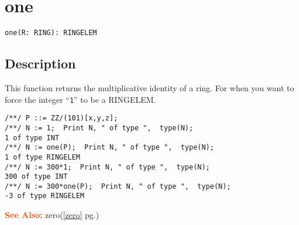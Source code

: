 \documentclass[a4paper]{mybook}
\newenvironment{command}{}{} %
\newcommand\SeeAlso{\par\textcolor{OrangeRed}{\textbf{\large See Also: }}}
\begin{document}
\section{one}
\label{one}
\begin{command} %


\begin{Verbatim}[label=syntax, rulecolor=\color{MidnightBlue},
frame=single]
one(R: RING): RINGELEM
\end{Verbatim}


\subsection*{Description}

This function returns the multiplicative identity of a ring.
For when you want to force the integer ``\verb&1&'' to be a RINGELEM.
\begin{Verbatim}[label=example, rulecolor=\color{PineGreen}, frame=single]
/**/ P ::= ZZ/(101)[x,y,z];
/**/ N := 1;  Print N, " of type ",  type(N);
1 of type INT
/**/ N := one(P);  Print N, " of type ",  type(N);
1 of type RINGELEM
/**/ N := 300*1;  Print N, " of type ",  type(N);
300 of type INT
/**/ N := 300*one(P);  Print N, " of type ",  type(N);
-3 of type RINGELEM
\end{Verbatim}


\SeeAlso %
  zero(\ref{zero} pg.\pageref{zero})
\end{command} %
\end{document}
